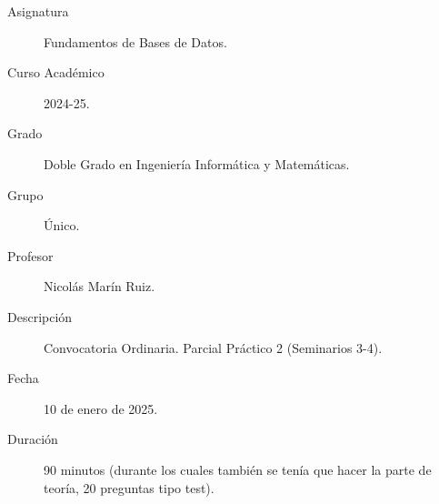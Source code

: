 \documentclass[12pt]{article}
\begin{document}

    
    

    \begin{description}
        \item[Asignatura] Fundamentos de Bases de Datos.
        \item[Curso Académico] 2024-25.
        \item[Grado] Doble Grado en Ingeniería Informática y Matemáticas.
        \item[Grupo] Único.
        \item[Profesor] Nicolás Marín Ruiz.
        \item[Descripción] Convocatoria Ordinaria. Parcial Práctico 2 (Seminarios 3-4).
        \item[Fecha] 10 de enero de 2025.
        \item[Duración] 90 minutos (durante los cuales también se tenía que hacer la parte de teoría, 20 preguntas tipo test).
    
    \end{description}
    \newpage
\end{document}
